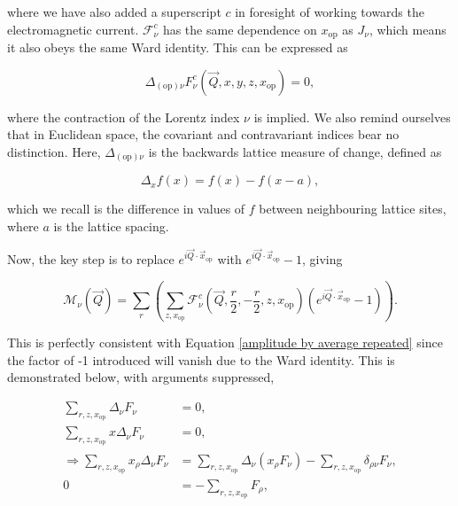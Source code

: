 \documentclass{article}
\numberwithin{equation}{section} %
\begin{document}
\noindent where we have also added a superscript $c$ in foresight of working towards the electromagnetic current. $\mathcal{F}^c_\nu$ has the same dependence on $x_\mathrm{op}$ as $J_\nu$, which means it also obeys the same Ward identity. This can be expressed as 

\begin{equation}
\Delta_{\mathrm{(op)}\nu}F^c_\nu(\vec{Q},x,y,z,x_\mathrm{op})=0,
\end{equation}

\noindent where the contraction of the Lorentz index $\nu$ is implied. We also remind ourselves that in Euclidean space, the covariant and contravariant indices bear no distinction. Here, $\Delta_{\mathrm{(op)}\nu}$ is the backwards lattice measure of change, defined as 

\begin{equation}
\Delta_xf(x) = f(x) - f(x-a),
\end{equation}

\noindent which we recall is the difference in values of $f$ between neighbouring lattice sites, where $a$ is the lattice spacing. 

Now, the key step is to replace $e^{i\vec{Q}\cdot\vec{x}_\mathrm{op}}$ with $e^{i\vec{Q}\cdot\vec{x}_\mathrm{op}}-1$, giving

\begin{equation}
\mathcal{M}_\nu(\vec{Q})= \sum_r\left(\sum_{z,x_\mathrm{op}} \mathcal{F}^c_\nu(\vec{Q},\frac{r}{2},-\frac{r}{2},z,x_\mathrm{op})(e^{i\vec{Q}\cdot\vec{x}_\mathrm{op}}-1)\right).
\label{amplitude by average -1}
\end{equation}

This is perfectly consistent with Equation \ref{amplitude by average repeated} since the factor of -1 introduced will vanish due to the Ward identity. This is demonstrated below, with arguments suppressed,

\begin{equation}
\begin{split}
\sum_{r,z,x_\mathrm{op}}\Delta_\nu F_\nu &= 0,\\
\sum_{r,z,x_\mathrm{op}}x\Delta_\nu F_\nu &= 0,\\
\Rightarrow\sum_{r,z,x_\mathrm{op}}x_\rho\Delta_\nu F_\nu &= \sum_{r,z,x_\mathrm{op}} \Delta_\nu (x_\rho F_\nu) - \sum_{r,z,x_\mathrm{op}}\delta_{\rho\nu}F_\nu,\\
0&= -\sum_{r,z,x_\mathrm{op}}F_\rho,
\end{split}
\end{equation}
\end{document}
